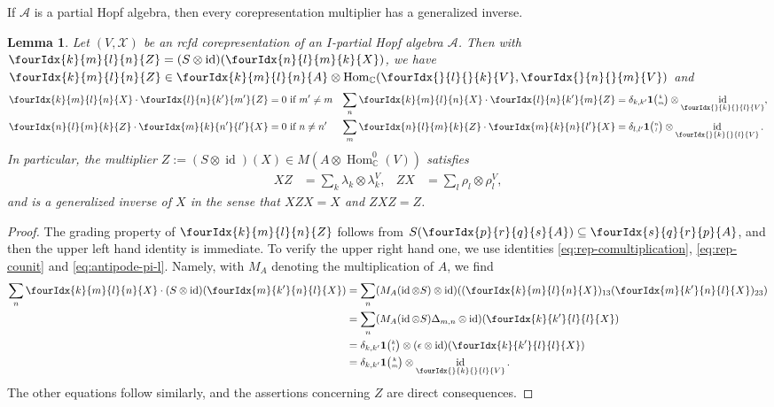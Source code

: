 \documentclass[10pt]{article}
\DeclareMathOperator{\id}{id}
\DeclareMathOperator{\Hom}{Hom}
\newcommand{\C}{\mathbb{C}}
\newcommand{\Grt}[3]{#1{\tiny {\begin{pmatrix} #2\\#3\end{pmatrix}}}}
\newcommand{\UnitC}[2]{\Grt{\mathbf{1}}{#1}{#2}}
\newcommand{\Gr}[5]{\fourIdx{#2}{#4}{#3}{#5}{#1}}%
\newcommand{\Gru}[3]{\Gr{#1}{}{}{#2}{#3}}
\newtheorem{Lem}[Theorem]{Lemma}
\theoremstyle{definition}
\numberwithin{equation}{section}
\begin{document}
If $\mathscr{A}$ is a partial Hopf algebra,  then every
corepresentation multiplier has a generalized inverse.
\begin{Lem} \label{lemma:rep-invertible}
  Let $(V,\mathscr{X})$ be an rcfd corepresentation of an $I$-partial Hopf
  algebra $\mathscr{A}$. Then with $\Gr{Z}{k}{l}{m}{n} = (S\otimes \id)(\Gr{X}{n}{m}{l}{k})$, we have $\Gr{Z}{k}{l}{m}{n}\in \Gr{A}{k}{l}{m}{n}\otimes \Hom_{\C}(\Gru{V}{l}{k},\Gru{V}{n}{m})$ and
  \begin{align*}
    \Gr{X}{k}{l}{m}{n}  \cdot \Gr{Z}{l}{k'}{n}{m'} &=0 \text{ if } m'\neq m &
      \sum_{n} \Gr{X}{k}{l}{m}{n} \cdot \Gr{Z}{l}{k'}{n}{m} &= \delta_{k,k'}\UnitC{k}{m} \otimes
      \id_{\Gru{V}{k}{l}}, \\
      \Gr{Z}{n}{m}{l}{k}\cdot \Gr{X}{m}{n'}{k}{l'} &= 0
      \text{ if } n\neq n' & 
      \sum_{m} \Gr{Z}{n}{m}{l}{k}\cdot \Gr{X}{m}{n}{k}{l'} &=
      \delta_{l,l'} \UnitC{n}{l} \otimes \id_{\Gru{V}{k}{l}}.
  \end{align*}
  In particular, the multiplier $Z:=     (S \otimes
  \id)(X) \in M(A \otimes \Hom_{\C}^{0}(V))$
  satisfies
  \begin{align} \label{eq:rep-generalized-inverse}
    XZ &= \sum_{k} \lambda_{k} \otimes \lambda^{V}_{k}, &
    ZX &= \sum_{l} \rho_{l} \otimes \rho^{V}_{l},
  \end{align}
  and is a generalized inverse of $X$ in the sense that $XZX=X$ and $ZXZ=Z$.
\end{Lem}
\begin{proof}
  The grading property of $\Gr{Z}{k}{l}{m}{n}$ follows from  $S(\Gr{A}{p}{q}{r}{s})\subseteq \Gr{A}{s}{r}{q}{p}$, and then the upper left hand identity is immediate.  To
  verify the upper right hand one, we use identities \eqref{eq:rep-comultiplication}, \eqref{eq:rep-counit} and \eqref{eq:antipode-pi-l}. Namely, with $M_{A}$ denoting the multiplication of $A$, we find
  \begin{align*}
      \sum_{n} \Gr{X}{k}{l}{m}{n} \cdot (S \otimes
      \id)(\Gr{X}{m}{n}{k'}{l}) &= \sum_{n} (M_{A}  (\id \otimes S)
      \otimes \id)((\Gr{X}{k}{l}{m}{n})_{13}(\Gr{X}{m}{n}{k'}{l})_{23})
 \\ &= \sum_{n} (M_{A} (\id \otimes S)  \Delta_{m,n} \otimes
      \id)(\Gr{X}{k}{l}{k'}{l}) \\
      &= \delta_{k,k'} \UnitC{k}{l} \otimes (\epsilon \otimes
      \id)(\Gr{X}{k}{l}{k'}{l})
      \\ &=
\delta_{k,k'}\UnitC{k}{m} \otimes
      \id_{\Gru{V}{k}{l}}. \end{align*} The other
equations follow similarly, and the assertions concerning $Z$ are
direct consequences.
\end{proof}
\end{document}
